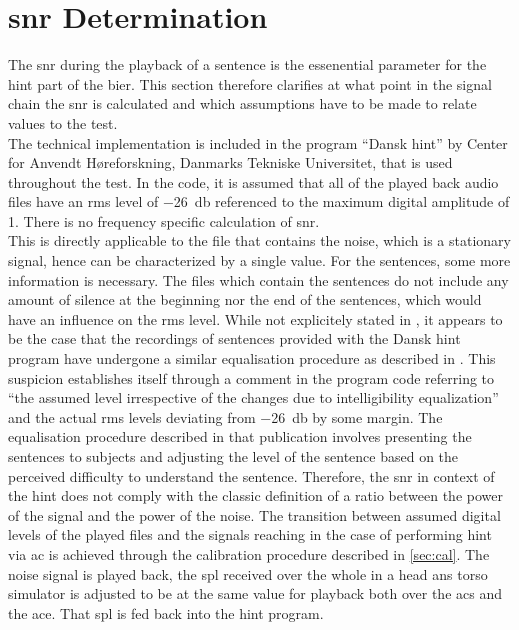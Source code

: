 \section{\gls{snr} Determination}\label{sec:snr_det}
The \gls{snr} during the playback of a sentence is the essenential parameter for the \gls{hint} part of the \gls{bier}.
This section therefore clarifies at what point in the signal chain the \gls{snr} is calculated and which assumptions have to be made to relate values to the test.\\
The technical implementation is included in the \matlab program \enquote{Dansk \gls{hint}} by Center for Anvendt Høreforskning, Danmarks Tekniske Universitet, that is used throughout the test.
In the code, it is assumed that all of the played back audio files have an \gls{rms} level of \SI{-26}{\decibel} referenced to the maximum digital amplitude of 1. There is no frequency specific calculation of \gls{snr}.\\
This is directly applicable to the file that contains the noise, which is a stationary signal, hence can be characterized by a single value.
For the sentences, some more information is necessary. The files which contain the sentences do not include any amount of silence at the beginning nor the end of the sentences, which would have an influence on the \gls{rms} level.
While not explicitely stated in \citep{hint_2011}, it appears to be the case that the recordings of sentences provided with the Dansk \gls{hint} program have undergone a similar equalisation procedure as described in \citep{nielsen_dau_09}. 
This suspicion establishes itself through a comment in the program code referring to \enquote{the assumed level irrespective of the changes due to intelligibility equalization} and the actual \gls{rms} levels deviating from \SI{-26}{\decibel} by some margin.
The equalisation procedure described in that publication involves presenting the sentences to subjects and adjusting the level of the sentence based on the perceived difficulty to understand the sentence.
Therefore, the \gls{snr} in context of the \gls{hint} does not comply with the classic definition of a ratio between the power of the signal and the power of the noise.
The transition between assumed digital levels of the played files and the signals reaching in the case of performing \gls{hint} via \gls{ac} is achieved through the calibration procedure described in \autoref{sec:cal}. The noise signal is played back, the \gls{spl} received over the whole in a head ans torso simulator is adjusted  to be at the same value for playback both over the \gls{acs} and the \gls{ace}. That \gls{spl} is fed back into the \gls{hint} \matlab program.

